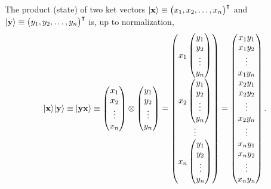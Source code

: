 The product (state) of two ket vectors
$\vert {\bf x}\rangle
\equiv
\begin{pmatrix}
x_1,
x_2,
\ldots ,
x_n
\end{pmatrix}^\intercal
$
and
$\vert {\bf y}\rangle
\equiv
\begin{pmatrix}
y_1,
y_2,
\ldots ,
y_n
\end{pmatrix}^\intercal
$
is, up to normalization,
\begin{equation}
\begin{split}
 \vert {\bf x}\rangle  \vert {\bf y}\rangle
\equiv \vert {\bf y} {\bf x}\rangle
\equiv
\begin{pmatrix}
x_1\\
x_2\\
\vdots \\
x_n
\end{pmatrix}
\otimes
 \begin{pmatrix}
y_1\\
y_2\\
\vdots \\
y_n
\end{pmatrix}
=
\begin{pmatrix}
x_1
\begin{pmatrix}
y_1\\
y_2\\
\vdots \\
y_n
\end{pmatrix}
\\
x_2
\begin{pmatrix}
y_1\\
y_2\\
\vdots \\
y_n
\end{pmatrix} \\
\vdots          \\
x_n  \begin{pmatrix}
y_1\\
y_2\\
\vdots \\
y_n
\end{pmatrix}
\end{pmatrix}
=\begin{pmatrix}
x_1y_1\\
x_1y_2\\
\vdots \\
x_1y_n  \\
x_2 y_1\\
x_2y_2\\
\vdots \\
x_2y_n  \\
\vdots \\
x_ny_1\\
x_ny_2\\
\vdots \\
x_ny_n
\end{pmatrix} .
\end{split}
\end{equation}




